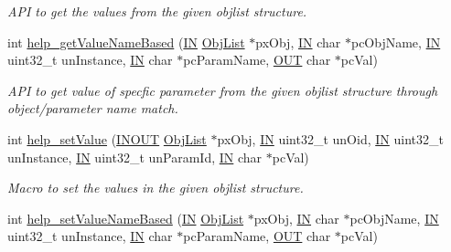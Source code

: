 \begin{DoxyCompactItemize}
\begin{DoxyCompactList}\small\item\em A\-P\-I to get the values from the given objlist structure. \end{DoxyCompactList}\item 
int \hyperlink{group__LIBHELP_gad312c66b9e182705fa46f4b11f244fb2}{help\-\_\-get\-Value\-Name\-Based} (\hyperlink{group__LIBHELP_gac2bbd6d630a06a980d9a92ddb9a49928}{I\-N} \hyperlink{structObjList}{Obj\-List} $\ast$px\-Obj, \hyperlink{group__LIBHELP_gac2bbd6d630a06a980d9a92ddb9a49928}{I\-N} char $\ast$pc\-Obj\-Name, \hyperlink{group__LIBHELP_gac2bbd6d630a06a980d9a92ddb9a49928}{I\-N} uint32\-\_\-t un\-Instance, \hyperlink{group__LIBHELP_gac2bbd6d630a06a980d9a92ddb9a49928}{I\-N} char $\ast$pc\-Param\-Name, \hyperlink{group__LIBHELP_gaec78e7a9e90a406a56f859ee456e8eae}{O\-U\-T} char $\ast$pc\-Val)
\begin{DoxyCompactList}\small\item\em A\-P\-I to get value of specfic parameter from the given objlist structure through object/parameter name match. \end{DoxyCompactList}\item 
int \hyperlink{group__LIBHELP_gadb4425c29e4125e82f952b0ead1fedd5}{help\-\_\-set\-Value} (\hyperlink{group__LIBHELP_ga62766f3ea8784d1db62df989f8f33d2d}{I\-N\-O\-U\-T} \hyperlink{structObjList}{Obj\-List} $\ast$px\-Obj, \hyperlink{group__LIBHELP_gac2bbd6d630a06a980d9a92ddb9a49928}{I\-N} uint32\-\_\-t un\-Oid, \hyperlink{group__LIBHELP_gac2bbd6d630a06a980d9a92ddb9a49928}{I\-N} uint32\-\_\-t un\-Instance, \hyperlink{group__LIBHELP_gac2bbd6d630a06a980d9a92ddb9a49928}{I\-N} uint32\-\_\-t un\-Param\-Id, \hyperlink{group__LIBHELP_gac2bbd6d630a06a980d9a92ddb9a49928}{I\-N} char $\ast$pc\-Val)
\begin{DoxyCompactList}\small\item\em Macro to set the values in the given objlist structure. \end{DoxyCompactList}\item 
int \hyperlink{group__LIBHELP_ga8e229b377f3ac19e8d9ac4bd70a92345}{help\-\_\-set\-Value\-Name\-Based} (\hyperlink{group__LIBHELP_gac2bbd6d630a06a980d9a92ddb9a49928}{I\-N} \hyperlink{structObjList}{Obj\-List} $\ast$px\-Obj, \hyperlink{group__LIBHELP_gac2bbd6d630a06a980d9a92ddb9a49928}{I\-N} char $\ast$pc\-Obj\-Name, \hyperlink{group__LIBHELP_gac2bbd6d630a06a980d9a92ddb9a49928}{I\-N} uint32\-\_\-t un\-Instance, \hyperlink{group__LIBHELP_gac2bbd6d630a06a980d9a92ddb9a49928}{I\-N} char $\ast$pc\-Param\-Name, \hyperlink{group__LIBHELP_gaec78e7a9e90a406a56f859ee456e8eae}{O\-U\-T} char $\ast$pc\-Val)

\end{DoxyCompactItemize}
